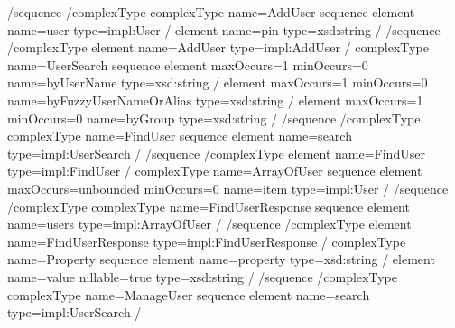 \documentclass[letterpaper,10pt,english]{sphinxmanual}
\begin{document}
\begin{sphinxVerbatim}[commandchars=\\\{\}]
\PYGZlt{}/sequence\PYGZgt{}
\PYGZlt{}/complexType\PYGZgt{}
\PYGZlt{}complexType name=\PYGZdq{}AddUser\PYGZdq{}\PYGZgt{}
\PYGZlt{}sequence\PYGZgt{}
\PYGZlt{}element name=\PYGZdq{}user\PYGZdq{} type=\PYGZdq{}impl:User\PYGZdq{} /\PYGZgt{}
\PYGZlt{}element name=\PYGZdq{}pin\PYGZdq{} type=\PYGZdq{}xsd:string\PYGZdq{} /\PYGZgt{}
\PYGZlt{}/sequence\PYGZgt{}
\PYGZlt{}/complexType\PYGZgt{}
\PYGZlt{}element name=\PYGZdq{}AddUser\PYGZdq{} type=\PYGZdq{}impl:AddUser\PYGZdq{} /\PYGZgt{}
\PYGZlt{}complexType name=\PYGZdq{}UserSearch\PYGZdq{}\PYGZgt{}
\PYGZlt{}sequence\PYGZgt{}
\PYGZlt{}element maxOccurs=\PYGZdq{}1\PYGZdq{} minOccurs=\PYGZdq{}0\PYGZdq{} name=\PYGZdq{}byUserName\PYGZdq{} type=\PYGZdq{}xsd:string\PYGZdq{} /\PYGZgt{}
\PYGZlt{}element maxOccurs=\PYGZdq{}1\PYGZdq{} minOccurs=\PYGZdq{}0\PYGZdq{} name=\PYGZdq{}byFuzzyUserNameOrAlias\PYGZdq{} type=\PYGZdq{}xsd:string\PYGZdq{} /\PYGZgt{}
\PYGZlt{}element maxOccurs=\PYGZdq{}1\PYGZdq{} minOccurs=\PYGZdq{}0\PYGZdq{} name=\PYGZdq{}byGroup\PYGZdq{} type=\PYGZdq{}xsd:string\PYGZdq{} /\PYGZgt{}
\PYGZlt{}/sequence\PYGZgt{}
\PYGZlt{}/complexType\PYGZgt{}
\PYGZlt{}complexType name=\PYGZdq{}FindUser\PYGZdq{}\PYGZgt{}
\PYGZlt{}sequence\PYGZgt{}
\PYGZlt{}element name=\PYGZdq{}search\PYGZdq{} type=\PYGZdq{}impl:UserSearch\PYGZdq{} /\PYGZgt{}
\PYGZlt{}/sequence\PYGZgt{}
\PYGZlt{}/complexType\PYGZgt{}
\PYGZlt{}element name=\PYGZdq{}FindUser\PYGZdq{} type=\PYGZdq{}impl:FindUser\PYGZdq{} /\PYGZgt{}
\PYGZlt{}complexType name=\PYGZdq{}ArrayOfUser\PYGZdq{}\PYGZgt{}
\PYGZlt{}sequence\PYGZgt{}
\PYGZlt{}element maxOccurs=\PYGZdq{}unbounded\PYGZdq{} minOccurs=\PYGZdq{}0\PYGZdq{} name=\PYGZdq{}item\PYGZdq{} type=\PYGZdq{}impl:User\PYGZdq{} /\PYGZgt{}
\PYGZlt{}/sequence\PYGZgt{}
\PYGZlt{}/complexType\PYGZgt{}
\PYGZlt{}complexType name=\PYGZdq{}FindUserResponse\PYGZdq{}\PYGZgt{}
\PYGZlt{}sequence\PYGZgt{}
\PYGZlt{}element name=\PYGZdq{}users\PYGZdq{} type=\PYGZdq{}impl:ArrayOfUser\PYGZdq{} /\PYGZgt{}
\PYGZlt{}/sequence\PYGZgt{}
\PYGZlt{}/complexType\PYGZgt{}
\PYGZlt{}element name=\PYGZdq{}FindUserResponse\PYGZdq{} type=\PYGZdq{}impl:FindUserResponse\PYGZdq{} /\PYGZgt{}
\PYGZlt{}complexType name=\PYGZdq{}Property\PYGZdq{}\PYGZgt{}
\PYGZlt{}sequence\PYGZgt{}
\PYGZlt{}element name=\PYGZdq{}property\PYGZdq{} type=\PYGZdq{}xsd:string\PYGZdq{} /\PYGZgt{}
\PYGZlt{}element name=\PYGZdq{}value\PYGZdq{} nillable=\PYGZdq{}true\PYGZdq{} type=\PYGZdq{}xsd:string\PYGZdq{} /\PYGZgt{}
\PYGZlt{}/sequence\PYGZgt{}
\PYGZlt{}/complexType\PYGZgt{}
\PYGZlt{}complexType name=\PYGZdq{}ManageUser\PYGZdq{}\PYGZgt{}
\PYGZlt{}sequence\PYGZgt{}
\PYGZlt{}element name=\PYGZdq{}search\PYGZdq{} type=\PYGZdq{}impl:UserSearch\PYGZdq{} /\PYGZgt{}

\end{sphinxVerbatim}
\end{document}
